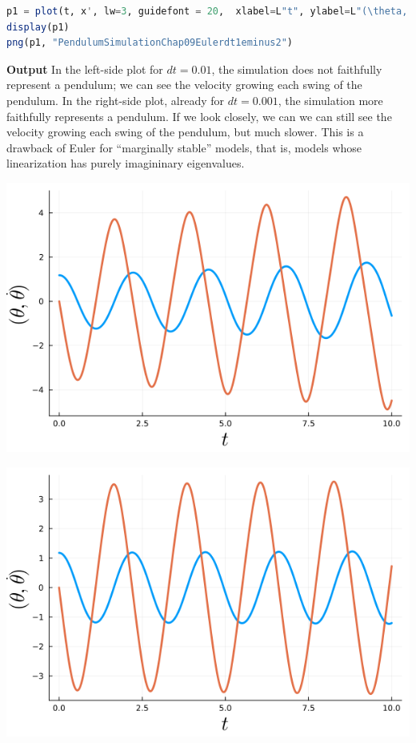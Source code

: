 \begin{enumerate}
\begin{lstlisting}[language=Julia,style=mystyle]
p1 = plot(t, x', lw=3, guidefont = 20,  xlabel=L"t", ylabel=L"(\theta, \dot{\theta})", legend=false)
display(p1)
png(p1, "PendulumSimulationChap09Eulerdt1eminus2")
\end{lstlisting}
\textbf{Output} 
In the left-side plot for $dt=0.01$, the simulation does not faithfully represent a pendulum; we can see the velocity growing each swing of the pendulum. In the right-side plot, already for $dt=0.001$, the simulation more faithfully represents a pendulum. If we look closely, we can we can still see the velocity growing each swing of the pendulum, but much slower. This is a drawback of Euler for ``marginally stable'' models, that is, models whose linearization has purely imagininary eigenvalues. 
\begin{center}
    \begin{minipage}{0.45\columnwidth}
        \includegraphics[width=\linewidth]{graphics/Chap09/PendulumSimulationChap09Eulerdt1eminus2.png}
    \end{minipage}
    \hfill
    \begin{minipage}{0.45\columnwidth}
        \includegraphics[width=\linewidth]{graphics/Chap09/PendulumSimulationChap09Eulerdt1eminus3.png}
    \end{minipage}
\end{center}
 \bigskip


\end{enumerate}
